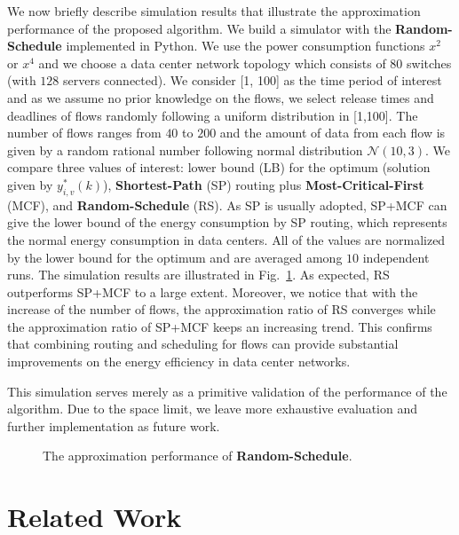 \documentclass[10pt, conference, compsocconf]{IEEEtran}
\begin{document}
We now briefly describe simulation results that illustrate the approximation performance of the proposed algorithm. We build a simulator with the \textbf{Random-Schedule} implemented in Python. We use the power consumption functions $x^{2}$ or $x^{4}$ and we choose a data center network topology which consists of $80$ switches (with $128$ servers connected). We consider [1, 100] as the time period of interest and as we assume no prior knowledge on the flows, we select release times and deadlines of flows randomly following a uniform distribution in [1,100].
The number of flows ranges from $40$ to $200$ and the amount of data from each flow is given by a random rational number following normal distribution $\mathcal{N}(10, 3)$. We compare three values of interest: lower bound (LB) for the optimum (solution given by $y^*_{i,v}(k)$), \textbf{Shortest-Path} (SP) routing plus \textbf{Most-Critical-First} (MCF), and \textbf{Random-Schedule} (RS). As SP is usually adopted, SP+MCF can give the lower bound of the energy consumption by SP routing, which represents the normal energy consumption in data centers. All of the values are normalized by the lower bound for the optimum and are averaged among $10$ independent runs. The simulation results are illustrated in Fig.~\ref{fig:sim}. As expected, RS outperforms SP+MCF to a large extent. Moreover, we notice that with the increase of the number of flows, the approximation ratio of RS converges while the approximation ratio of SP+MCF keeps an increasing trend. This confirms that combining routing and scheduling for flows can provide substantial improvements on the energy efficiency in data center networks.

This simulation serves merely as a primitive validation of the performance of the algorithm. Due to the space limit, we leave more exhaustive evaluation and further implementation as future work.

\begin{figure}[!t]
	\centering
	\hspace{0in}
	\caption{The approximation performance of \textbf{Random-Schedule}.}
	\label{fig:sim} 
	\vspace{-0.45cm}
\end{figure}

\section{Related Work}
\label{sec:related}
\end{document}

